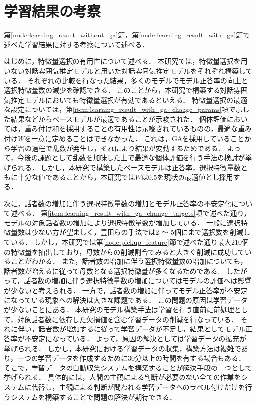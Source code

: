 \section{学習結果の考察}

第\ref{node:learning_result_without_ga}節，第\ref{node:learning_result_with_ga}節で述べた学習結果に対する考察について述べる．

はじめに，特徴量選択の有用性について述べる．
本研究では，特徴量選択を用いない対話雰囲気推定モデルと用いた対話雰囲気推定モデルをそれぞれ構築している．
それぞれの比較を行なった結果，多くのモデルでモデル正答率の向上と選択特徴量数の減少を確認できる．
このことから，本研究で構築する対話雰囲気推定モデルにおいても特徴量選択が有効であるといえる．
特徴量選択の最適な設定については，第\ref{item:learning_result_with_ga_change_params}項で示した結果などからベースモデルが最適であることが示唆された．
個体評価においては，重み付け和を採用することの有用性は示唆されているものの，最適な重み付け$W$を一意に定めることはできなかった．
これは，GAを採用していることから学習の過程で乱数が発生し，それにより結果が変動するためである．
よって，今後の課題として乱数を加味した上で最適な個体評価を行う手法の検討が挙げられる．
しかし，本研究で構築したベースモデルは正答率，選択特徴量数ともに十分な値であることから，本研究では$W$は0.5を現状の最適値とし採用する．

次に，話者数の増加に伴う選択特徴量数の増加とモデル正答率の不安定化について述べる．
第\ref{item:learning_result_with_ga_change_targets}項で述べた通り，モデルの対象話者数の増加により選択特徴量数が増加している．
一般に選択特徴量数は少ない方が望ましく，豊田らの手法では2 〜 5個にまで選択数を削減している．
しかし，本研究では第\ref{node:pickup_feature}節で述べた通り最大210個の特徴量を抽出しており，母数からの削減割合でみると大きぐ削減に成功していることがわかる．
また，話者数の増加に伴う選択特徴量数の増加についても，話者数が増えるに従って母数となる選択特徴量が多くなるためである．
したがって，話者数の増加に伴う選択特徴量数の増加についてはモデルの評価へは影響が少ないと考えられる．
一方で，話者数の増加に伴ってモデル正答率が不安定になっている現象への解決は大きな課題である．
この問題の原因は学習データが少ないことにある．
本研究のモデル構築手法は学習を行う直前に前処理として，対象話者数に依存した欠損値を含む学習データの削減を行なっている．
それに伴い，話者数が増加するに従って学習データが不足し，結果としてモデル正答率が不安定になっている．
よって，原因の解決としては学習データの拡充が挙げられる．
しかし，本研究における学習データの収集，構築方法は複雑であり，一つの学習データを作成するために30分以上の時間を有する場合もある．
そこで，学習データの自動収集システムを構築することが解決手段の一つとして挙げられる．
具体的には，人間の主観による判断が必要のない全ての作業をシステムに代替し，主観による判断が問われる学習データへのラベル付けだけを行うシステムを構築することで問題の解決が期待できる．

